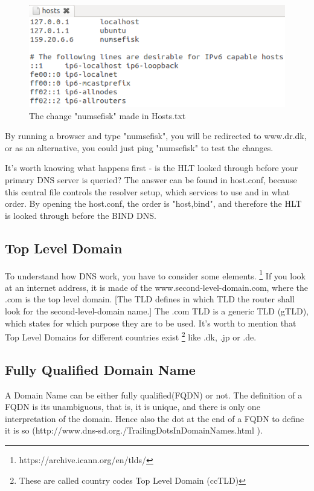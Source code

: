 \begin{figure}[ht!]
\centering
\includegraphics[width=150mm]{img/hostsText.png}
\caption{The change "numsefisk" made in Hosts.txt}
\label{hostsText}
\end{figure}

By running a browser and type "numsefisk", you will be redirected to www.dr.dk, or as an alternative, you could just ping "numsefisk" to test the changes.

It's worth knowing what happens first - is the HLT looked through before your primary DNS server is queried?
The answer can be found in host.conf, because this central file controls the resolver setup, which services to use and in what order. By opening the host.conf, the order is "host,bind", and therefore the HLT is looked through before the BIND DNS.


\subsection{Top Level Domain}
To understand how DNS work, you have to consider some elements. \footnote{ https://archive.icann.org/en/tlds/ } If you look at an internet address, it is made of the www.second-level-domain.com, where the .com is the top level domain. [The TLD defines in which TLD the router shall look for the second-level-domain name.]
The .com TLD is a generic TLD (gTLD), which states for which purpose they are to be used. It's worth to mention that Top Level Domains for different countries exist \footnote{ These are called country codes Top Level Domain (ccTLD) } like .dk, .jp or .de.

\subsection{Fully Qualified Domain Name}
A Domain Name can be either fully qualified(FQDN) or not. The definition of a FQDN is its unambiguous, that is, it is unique, and there is only one interpretation of the domain. Hence also the dot at the end of a FQDN to define it is so (http://www.dns-sd.org./TrailingDotsInDomainNames.html ).

